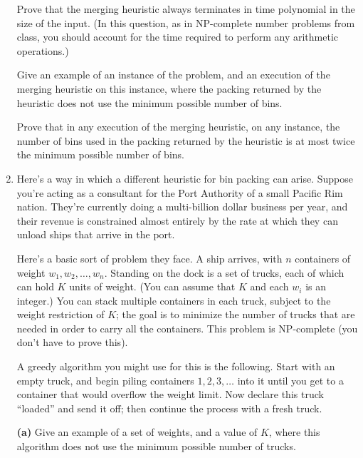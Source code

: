 \documentclass[12pt]{article}
\begin{document}
\begin{enumerate}
Prove that the merging heuristic always terminates in time
polynomial in the size of the input.
(In this question, as in NP-complete number problems from class,
you should account for the time required to perform
any arithmetic operations.)

\bigskip
{} 
Give an example of an instance
of the problem, and an execution of the merging heuristic
on this instance, where the packing returned by
the heuristic does not use the minimum possible number of bins.

\bigskip
{} 
Prove that in any execution of the merging heuristic,
on any instance,
the number of bins used in the packing returned by
the heuristic is at most twice the minimum possible number
of bins.


\item 

Here's a way in which a different heuristic for 
bin packing can arise.
Suppose you're acting as a consultant
for the Port Authority of a small Pacific Rim nation.
They're currently doing a multi-billion dollar business
per year, and their revenue is constrained almost entirely
by the rate at which they can unload ships that arrive in the port.

Here's a basic sort of problem they face.
A ship arrives, with $n$ containers of weight
$w_1, w_2, \ldots, w_n$.
Standing on the dock is a set of trucks, each of
which can hold $K$ units of weight.
(You can assume that $K$ and each $w_i$ is an integer.)
You can stack multiple containers in each truck,
subject to the weight restriction of $K$;
the goal is to minimize the number of trucks that are
needed in order to carry all the containers.
This problem is NP-complete (you don't have to prove this).

A greedy algorithm you might use for this is the following.
Start with an empty truck, and begin piling containers
$1, 2, 3, \ldots $ into it until you get to a container
that would overflow the weight limit.
Now declare this truck ``loaded'' and send it off;
then continue the process with a fresh truck.

{\bf (a)} Give an example of a set of weights, and
a value of $K$, where this algorithm does not use the
minimum possible number of trucks.


\end{enumerate}
\end{document}
